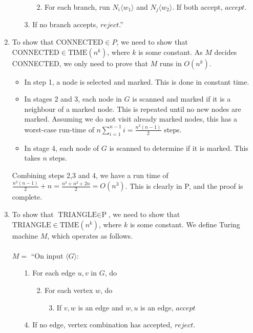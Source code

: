 \documentclass[11pt]{article}
\begin{document}
\begin{enumerate}[7.1]
\begin{enumerate}
      \begin{enumerate}
        \item[2.] For each branch, run $N_i\langle w_1 \rangle$ and $N_j\langle w_2 \rangle$. If both accept, $accept$.
      \end{enumerate}
      \item[3.] If no branch accepts, $reject$.''
    \end{enumerate}
  \item To show that $\text{CONNECTED} \in P$, we need to show that $\text{CONNECTED} \in \text{TIME}(n^k)$, where $k$ is some constant. As $M$ decides CONNECTED, we only need to prove that $M$ runs in $O(n^k)$.
    \begin{itemize}
      \item In step 1, a node is selected and marked. This is done in constant time.
      \item In stages 2 and 3, each node in $G$ is scanned and marked if it is a neighbour of a marked node. This is repeated until no new nodes are marked. Assuming we do not visit already marked nodes, this has a worst-case run-time of $n \sum_{i=1}^{n-1} i = \frac{n^2(n - 1)}{2}$ steps.
      \item In stage 4, each node of $G$ is scanned to determine if it is marked. This takes $n$ steps.
    \end{itemize}
    Combining steps 2,3 and 4, we have a run time of $\frac{n^2(n-1)}{2} + n = \frac{n^3 + n^2 + 2n}{2} = O(n^3)$. This is clearly in P, and the proof is complete.
  \item To show that $\text{TRIANGLE} \in \text{P}$, we need to show that $\text{TRIANGLE} \in \text{TIME}(n^k)$, where $k$ is some constant. We define Turing machine $M$, which operates as follows.\\\\
    $M =$ ``On input $\langle G \rangle$:
    \begin{enumerate}
      \item[1.] For each edge $u, v$ in $G$, do
        \begin{enumerate}
        \item[2.] For each vertex $w$, do
          \begin{enumerate}
            \item[3.] If $v, w$ is an edge and $w, u$ is an edge, $accept$
          \end{enumerate}
        \end{enumerate}
      \item[4.] If no edge, vertex combination has accepted, $reject$.

\end{enumerate}
\end{enumerate}
\end{document}
